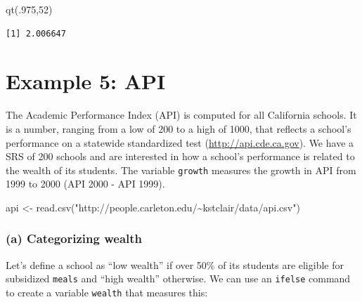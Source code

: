 \documentclass[
]{book}
\newenvironment{Shaded}{\begin{snugshade}}{\end{snugshade}}
\newcommand{\DecValTok}[1]{\textcolor[rgb]{0.00,0.00,0.81}{#1}}
\newcommand{\FunctionTok}[1]{\textcolor[rgb]{0.00,0.00,0.00}{#1}}
\newcommand{\NormalTok}[1]{#1}
\newcommand{\OtherTok}[1]{\textcolor[rgb]{0.56,0.35,0.01}{#1}}
\newcommand{\SpecialCharTok}[1]{\textcolor[rgb]{0.00,0.00,0.00}{#1}}
\newcommand{\StringTok}[1]{\textcolor[rgb]{0.31,0.60,0.02}{#1}}
\begin{document}
\begin{Shaded}
\begin{Highlighting}[]
\FunctionTok{qt}\NormalTok{(.}\DecValTok{975}\NormalTok{,}\DecValTok{52}\NormalTok{)}
\end{Highlighting}
\end{Shaded}

\begin{verbatim}
[1] 2.006647
\end{verbatim}

\hypertarget{example-5-api}{%
\section{Example 5: API}\label{example-5-api}}

The Academic Performance Index (API) is computed for all California schools. It is a number, ranging from a low of 200 to a high of 1000, that reflects a school's performance on a statewide standardized test (\url{http://api.cde.ca.gov}). We have a SRS of 200 schools and are interested in how a school's performance is related to the wealth of its students. The variable \texttt{growth} measures the growth in API from 1999 to 2000 (API 2000 - API 1999).

\begin{Shaded}
\begin{Highlighting}[]
\NormalTok{api }\OtherTok{\textless{}{-}} \FunctionTok{read.csv}\NormalTok{(}\StringTok{"http://people.carleton.edu/\textasciitilde{}kstclair/data/api.csv"}\NormalTok{)}
\end{Highlighting}
\end{Shaded}

\hypertarget{a-categorizing-wealth}{%
\subsubsection{(a) Categorizing wealth}\label{a-categorizing-wealth}}

Let's define a school as ``low wealth'' if over 50\% of its students are eligible for subsidized \texttt{meals} and ``high wealth'' otherwise. We can use an \texttt{ifelse} command to create a variable \texttt{wealth} that measures this:

\begin{Shaded}
\end{Shaded}
\end{document}
